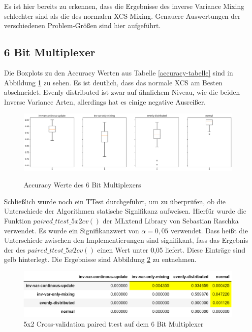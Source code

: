 \documentclass{ocsmnar}
\begin{document}
Es ist hier bereits zu erkennen, dass die Ergebnisse des inverse Variance Mixing schlechter sind als die des normalen XCS-Mixing. 
Genauere Auswertungen der verschiedenen Problem-Größen sind hier aufgeführt. 

\subsection{6 Bit Multiplexer}
Die Boxplots zu den Accuracy Werten aus Tabelle \ref{accuracy-tabelle} sind in Abbildung \ref{boxplot-6-bit} zu sehen. Es ist deutlich, dass das normale XCS am Besten abschneidet. Evenly-distributed ist zwar auf ähnlichem Niveau, wie die beiden Inverse Variance Arten, allerdings hat es einige negative Ausreißer. 


\begin{figure}
    \includegraphics[width=\linewidth]{img/boxplot_6Bitpng.png}
    \caption{Accuracy Werte des 6 Bit Multiplexers}
    \label{boxplot-6-bit}
\end{figure}

Schließlich wurde noch ein TTest durchgeführt, um zu überprüfen, ob die Unterschiede der Algorithmen statische Signifikanz aufweisen. Hierfür wurde die Funktion $paired\_ttest\_5x2cv()$ der MLxtend Library von Sebastian Raschka verwendet. Es wurde ein Signifikanzwert von $\alpha = 0,05$ verwendet. Dass heißt die Unterschiede zwischen den Implementierungen sind signifikant, fass das Ergebnis der des $paired\_ttest\_5x2cv()$ einen Wert unter 0,05 liefert. Diese Einträge sind gelb hinterlegt. Die Ergebnisse sind Abbildung \ref{ttest-6-bit} zu entnehmen. 

\begin{figure}
    \includegraphics[width=\linewidth]{img/ttest_6_bit.png}
    \caption{5x2 Cross-validation paired ttest auf dem 6 Bit Multiplexer}\label{ttest-6-bit}
\end{figure}
\end{document}
